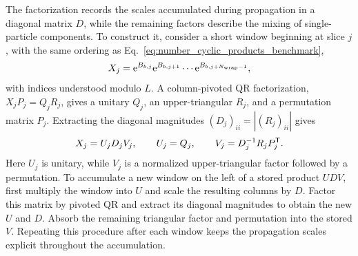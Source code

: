 The factorization records the scales accumulated during propagation in a diagonal matrix $D$, while the remaining factors describe the mixing of single-particle components. To construct it, consider a short window beginning at slice $j$, with the same ordering as Eq.~\eqref{eq:number_cyclic_products_benchmark},
\begin{equation}
    X_j=\mathrm{e}^{B_{b,j}}\mathrm{e}^{B_{b,j+1}}\cdots\mathrm{e}^{B_{b,j+N_{\rm wrap}-1}},
\end{equation}
with indices understood modulo $L$. A column-pivoted QR factorization, $X_jP_j=Q_jR_j$, gives a unitary $Q_j$, an upper-triangular $R_j$, and a permutation matrix $P_j$. Extracting the diagonal magnitudes $(D_j)_{ii}=|(R_j)_{ii}|$ gives
\begin{equation}
    X_j=U_jD_jV_j,
    \qquad U_j=Q_j,
    \qquad V_j=D_j^{-1}R_jP_j^{\mathsf{T}}.
    \label{eq:window_udv_number}
\end{equation}
Here $U_j$ is unitary, while $V_j$ is a normalized upper-triangular factor followed by a permutation. To accumulate a new window on the left of a stored product $UDV$, first multiply the window into $U$ and scale the resulting columns by $D$. Factor this matrix by pivoted QR and extract its diagonal magnitudes to obtain the new $U$ and $D$. Absorb the remaining triangular factor and permutation into the stored $V$. Repeating this procedure after each window keeps the propagation scales explicit throughout the accumulation.

